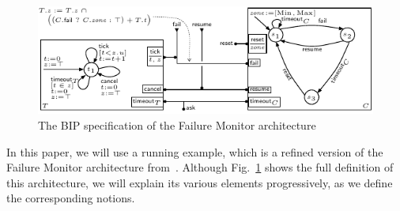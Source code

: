 \documentclass{llncs}
\newcommand{\fig}[1]{Fig.~\ref{fig:#1}}
\begin{document}
\begin{figure}[t]
  \centering
  \includegraphics[width=0.9\columnwidth]{BIPspec-ArchFailureTimerMax-v4}
  \caption{The BIP specification of the Failure Monitor architecture}
  \label{fig:schema:ArchFailure:BIP}
\end{figure}

In this paper, we will use a running example, which is a refined
version of the Failure Monitor architecture
from~\cite{CubETH-case-study}.  Although \fig{schema:ArchFailure:BIP}
shows the full definition of this architecture, we will explain its
various elements progressively, as we define the corresponding
notions.
\end{document}
